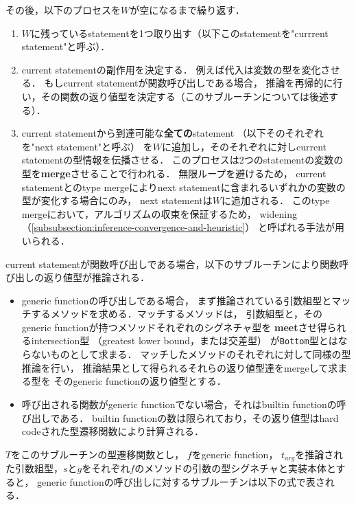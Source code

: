その後，以下のプロセスを\(W\)が空になるまで繰り返す．

\begin{enumerate}
  \item \(W\)に残っているstatementを1つ取り出す（以下このstatementを"currrent statement"と呼ぶ）．
  \item current statementの副作用を決定する．
        例えば代入は変数の型を変化させる．
        もしcurrent statementが関数呼び出しである場合，
        推論を再帰的に行い，その関数の返り値型を決定する（このサブルーチンについては後述する）．
  \item current statementから到達可能な\textbf{全ての}statement
        （以下そのそれぞれを"next statement"と呼ぶ）
        を\(W\)に追加し，そのそれぞれに対しcurrent statementの型情報を伝播させる．
        このプロセスは2つのstatementの変数の型を\textbf{merge}させることで行われる．
        無限ループを避けるため，
        current statementとのtype mergeによりnext statementに含まれるいずれかの変数の型が変化する場合にのみ，
        next statementは\(W\)に追加される．
        このtype mergeにおいて，アルゴリズムの収束を保証するため，
        widening（\ref{subsubsection:inference-convergence-and-heuristic}）
        と呼ばれる手法が用いられる．
\end{enumerate}

\newpage

current statementが関数呼び出しである場合，以下のサブルーチンにより関数呼び出しの返り値型が推論される．

\begin{itemize}
  \item generic functionの呼び出しである場合，
        まず推論されている引数組型とマッチするメソッドを求める．マッチするメソッドは，
        引数組型と，そのgeneric functionが持つメソッドそれぞれのシグネチャ型を
        \textbf{meet}させ得られるintersection型
        （greatest lower bound，または交差型）\footnotemark
        が\texttt{Bottom}型とはならないものとして求まる．
        マッチしたメソッドのそれぞれに対して同様の型推論を行い，
        推論結果として得られるそれらの返り値型達をmergeして求まる型を
        そのgeneric functionの返り値型とする．
  \item 呼び出される関数がgeneric functionでない場合，それはbuiltin functionの呼び出しである．
        builtin functionの数は限られており，その返り値型はhard codeされた型遷移関数により計算される．
\end{itemize}

\(T\)をこのサブルーチンの型遷移関数とし，
\(f\)をgeneric function，
\(t_{arg}\)を推論された引数組型，\(s\)と\(g\)をそれぞれ\(f\)のメソッドの引数の型シグネチャと実装本体とすると，
generic functionの呼び出しに対するサブルーチンは以下の式で表される．


